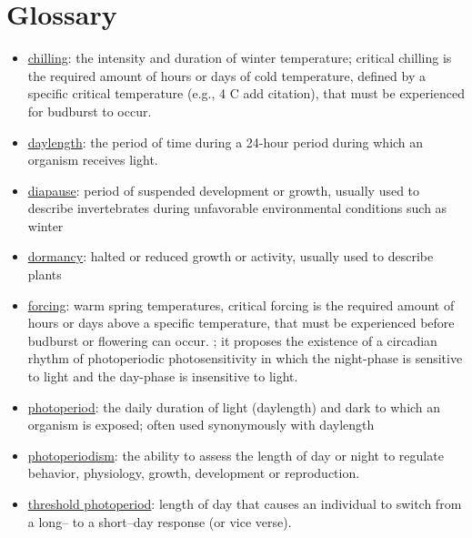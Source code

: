 \documentclass{article}
\begin{document}
\section* {Glossary}
\begin{itemize}
\item \underline{chilling}: the intensity and duration of winter temperature; critical chilling is the required amount of hours or days of cold temperature, defined by a specific critical temperature (e.g., 4 \degree C add citation), that must be experienced for budburst to occur.
\item \underline{daylength}: the period of time during a 24-hour period during which an organism receives light.

\item \underline{diapause}: period of suspended development or growth, usually used to describe invertebrates during unfavorable environmental conditions such as winter
\item \underline{dormancy}: halted or reduced growth or activity, usually used to describe plants
\item \underline{forcing}: warm spring temperatures, critical forcing is the required amount of hours or days above a specific temperature, that must be experienced before budburst or flowering can occur.
; it proposes the existence of a circadian rhythm of photoperiodic photosensitivity in which the night-phase is sensitive to light and the day-phase is insensitive to light. 
\item \underline{photoperiod}: the daily duration of light (daylength) and dark to which an organism is exposed; often used synonymously with daylength
\item \underline{photoperiodism}: the ability to assess the length of day or night to regulate behavior, physiology, growth, development or reproduction.
\item \underline{threshold photoperiod}: length of day that causes an individual to switch from a long-- to a short--day response (or vice verse).
\end{itemize}
\end{document}
